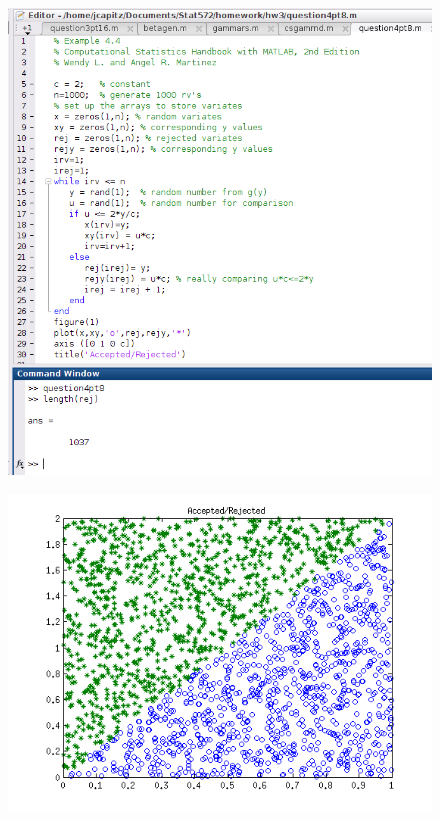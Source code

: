 \documentclass[12pt,a4paper]{article}
\begin{document}
\begin{figure}[ht!]
\begin{center}
\includegraphics[scale=.60]{q4pt8_code.png}
\caption{}
\label{q4pt8fig1}
\end{center}
\end{figure}
\FloatBarrier

\begin{figure}[ht!]
\begin{center}
\includegraphics[scale=.80]{q4pt8_plot.png}
\caption{}
\label{q4pt8fig2}
\end{center}
\end{figure}
\FloatBarrier
\end{document}

